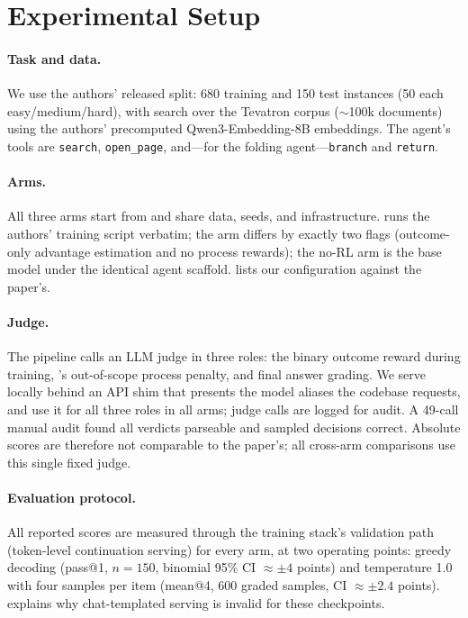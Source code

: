 \section{Experimental Setup}
\label{sec:setup}

\paragraph{Task and data.} We use the authors' released \bcplus{} split: 680 training and 150
test instances (50 each easy/medium/hard), with search over the Tevatron \bcplus{} corpus
($\sim$100k documents) using the authors' precomputed Qwen3-Embedding-8B embeddings. The agent's
tools are \texttt{search}, \texttt{open\_page}, and---for the folding agent---\texttt{branch}
and \texttt{return}.

\paragraph{Arms.} All three arms start from \qwen{} and share data, seeds, and infrastructure.
\foldgrpo{} runs the authors' training script verbatim; the \grpo{} arm differs by exactly two
flags (outcome-only advantage estimation and no process rewards); the no-RL arm is the base
model under the identical agent scaffold.  lists our configuration against the
paper's.

\paragraph{Judge.} The pipeline calls an LLM judge in three roles: the binary outcome reward
during training, \foldgrpo{}'s out-of-scope process penalty, and final answer grading. We serve
\judgemodel{} locally behind an API shim that presents the model aliases the codebase requests,
and use it for all three roles in all arms; judge calls are logged for audit. A 49-call manual
audit found all verdicts parseable and sampled decisions correct. Absolute scores are therefore
not comparable to the paper's; all cross-arm comparisons use this single fixed judge.

\paragraph{Evaluation protocol.} All reported scores are measured through the training stack's
validation path (token-level continuation serving) for every arm, at two operating points:
greedy decoding (pass@1, $n{=}150$, binomial 95\% CI $\approx \pm 4$ points) and temperature
1.0 with four samples per item (mean@4, 600 graded samples, CI $\approx \pm 2.4$ points).
 explains why chat-templated serving is invalid for these checkpoints.

